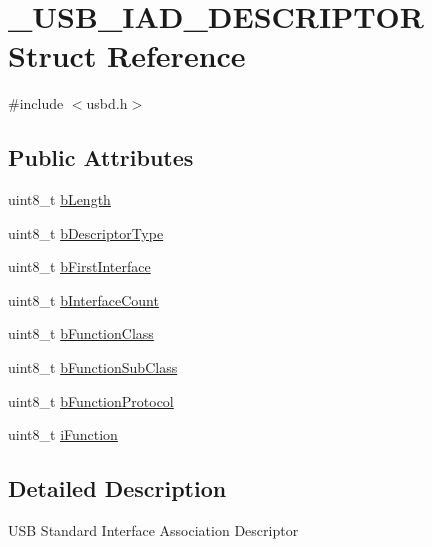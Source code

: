 \hypertarget{struct___u_s_b___i_a_d___d_e_s_c_r_i_p_t_o_r}{}\section{\+\_\+\+U\+S\+B\+\_\+\+I\+A\+D\+\_\+\+D\+E\+S\+C\+R\+I\+P\+T\+OR Struct Reference}
\label{struct___u_s_b___i_a_d___d_e_s_c_r_i_p_t_o_r}


{\ttfamily \#include $<$usbd.\+h$>$}

\subsection*{Public Attributes}
\begin{DoxyCompactItemize}
\item 
uint8\+\_\+t \hyperlink{struct___u_s_b___i_a_d___d_e_s_c_r_i_p_t_o_r_a479007e955942af951b4f600a93f7453}{b\+Length}
\item 
uint8\+\_\+t \hyperlink{struct___u_s_b___i_a_d___d_e_s_c_r_i_p_t_o_r_a3cb057fa923dfd71e2733fe638692687}{b\+Descriptor\+Type}
\item 
uint8\+\_\+t \hyperlink{struct___u_s_b___i_a_d___d_e_s_c_r_i_p_t_o_r_a27e39686c573003d8d7a191139c959fd}{b\+First\+Interface}
\item 
uint8\+\_\+t \hyperlink{struct___u_s_b___i_a_d___d_e_s_c_r_i_p_t_o_r_adbaa947d670f827e1c063614daa792fe}{b\+Interface\+Count}
\item 
uint8\+\_\+t \hyperlink{struct___u_s_b___i_a_d___d_e_s_c_r_i_p_t_o_r_a4395c6765bf418652bcf73626731518b}{b\+Function\+Class}
\item 
uint8\+\_\+t \hyperlink{struct___u_s_b___i_a_d___d_e_s_c_r_i_p_t_o_r_ace36407d116b50a76320813cd2174a8c}{b\+Function\+Sub\+Class}
\item 
uint8\+\_\+t \hyperlink{struct___u_s_b___i_a_d___d_e_s_c_r_i_p_t_o_r_ab0aa68806b463f0ce4ffdcfb5c1bbba4}{b\+Function\+Protocol}
\item 
uint8\+\_\+t \hyperlink{struct___u_s_b___i_a_d___d_e_s_c_r_i_p_t_o_r_a486ad14fb6b12d498212061b9610ce02}{i\+Function}
\end{DoxyCompactItemize}


\subsection{Detailed Description}
U\+SB Standard Interface Association Descriptor 

